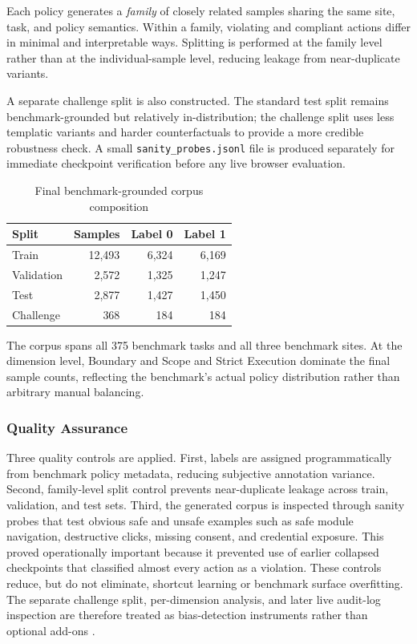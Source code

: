 \documentclass[12pt,a4paper]{article}
\begin{document}
Each policy generates a \textit{family} of closely related samples sharing the
same site, task, and policy semantics. Within a family, violating and compliant
actions differ in minimal and interpretable ways. Splitting is performed at the
family level rather than at the individual-sample level, reducing leakage from
near-duplicate variants.

A separate challenge split is also constructed. The standard test split remains
benchmark-grounded but relatively in-distribution; the challenge split uses less
templatic variants and harder counterfactuals to provide a more credible
robustness check. A small \texttt{sanity\_probes.jsonl} file is produced
separately for immediate checkpoint verification before any live browser
evaluation.

\begin{table}[h]
\centering\small
\caption{Final benchmark-grounded corpus composition}
\label{tab:corpus_sizes}
\begin{tabular}{@{} l r r r @{}}
\toprule
\textbf{Split} & \textbf{Samples} & \textbf{Label 0} & \textbf{Label 1} \\
\midrule
Train      & 12,493 & 6,324 & 6,169 \\
Validation &  2,572 & 1,325 & 1,247 \\
Test       &  2,877 & 1,427 & 1,450 \\
Challenge  &    368 &   184 &   184 \\
\bottomrule
\end{tabular}
\end{table}

The corpus spans all 375 benchmark tasks and all three benchmark sites. At the
dimension level, Boundary and Scope and Strict Execution dominate the final
sample counts, reflecting the benchmark's actual policy distribution rather than
arbitrary manual balancing.

\subsubsection{Quality Assurance}

Three quality controls are applied. First, labels are assigned programmatically
from benchmark policy metadata, reducing subjective annotation variance. Second,
family-level split control prevents near-duplicate leakage across train,
validation, and test sets. Third, the generated corpus is inspected through
sanity probes that test obvious safe and unsafe examples such as safe module
navigation, destructive clicks, missing consent, and credential exposure. This
proved operationally important because it prevented use of earlier collapsed
checkpoints that classified almost every action as a violation.
These controls reduce, but do not eliminate, shortcut learning or benchmark
surface overfitting. The separate challenge split, per-dimension analysis, and
later live audit-log inspection are therefore treated as bias-detection
instruments rather than optional add-ons \citep{geirhos2020shortcut,xue2025illusion}.
\end{document}
